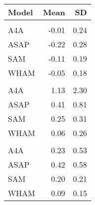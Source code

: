 
\begin{tabular}{lrr}
\toprule
Model & Mean & SD\\
\midrule
\addlinespace[0.3em]
\multicolumn{3}{l}{$\overline{F}$}\\
\hspace{1em}A4A & -0.01 & 0.24\\
\hspace{1em}ASAP & -0.22 & 0.28\\
\hspace{1em}SAM & -0.11 & 0.19\\
\hspace{1em}WHAM & -0.05 & 0.18\\
\addlinespace[0.3em]
\multicolumn{3}{l}{$R$}\\
\hspace{1em}A4A & 1.13 & 2.30\\
\hspace{1em}ASAP & 0.41 & 0.81\\
\hspace{1em}SAM & 0.25 & 0.31\\
\hspace{1em}WHAM & 0.06 & 0.26\\
\addlinespace[0.3em]
\multicolumn{3}{l}{SSB}\\
\hspace{1em}A4A & 0.23 & 0.53\\
\hspace{1em}ASAP & 0.42 & 0.58\\
\hspace{1em}SAM & 0.20 & 0.21\\
\hspace{1em}WHAM & 0.09 & 0.15\\
\bottomrule
\end{tabular}
